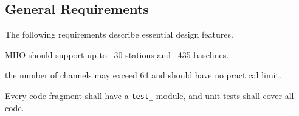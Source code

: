 

%
%




\subsection{General Requirements}
\label{sec:genreq}

The following requirements describe essential design features.

\begin{description}
 \ac{MHO} should support up to
    \TBD~30 stations and \TBD~435 baselines.
    
 the number of \acsp{channel} may exceed 64 and should
    have no practical limit.

 Every code fragment shall have a \texttt{test\_} module, and unit 
tests shall cover all code.

\end{description}

